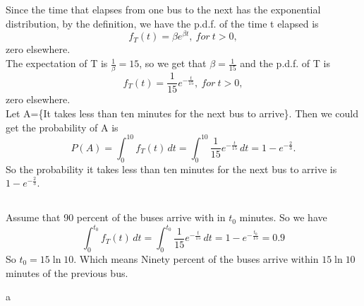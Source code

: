 \documentclass[10.5pt]{article}
\begin{document}
\section{}
\subsection{}
Since the time that elapses from one bus to the next has the exponential distribution, by the definition, we have the p.d.f. of the time t elapsed is $$f_T(t)=\beta e^{\beta t},~for ~t>0,$$\indent
zero elsewhere.\\\indent
The expectation of T is $\frac{1}{\beta}=15$, so we get that $\beta=\frac{1}{15}$ and the p.d.f. of T is $$f_T(t)=\frac{1}{15}e^{-\frac{t}{15}},~for ~t>0,$$\indent
zero elsewhere.\\\indent
Let A=\{It takes less than ten minutes for the next bus to arrive\}. Then we could get the probability of A is $$P(A)=\int_0^{10}f_T(t)\,dt=\int_0^{10}\frac{1}{15}e^{-\frac{t}{15}}\,dt=1-e^{-\frac{2}{3}}.$$\indent
So the probability it takes less than ten minutes for the next bus to arrive is $1-e^{-\frac{2}{3}}$.
\subsection{}
Assume that 90 percent of the buses arrive with in $t_0$ minutes. So we have $$\int_0^{t_0}f_T(t)\,dt=\int_0^{t_0}\frac{1}{15}e^{-\frac{t}{15}}\,dt=1-e^{-\frac{t_0}{15}}=0.9$$\indent
So $t_0=15\ln{10}$. Which means Ninety percent of the buses arrive within $15\ln{10}$ minutes of the previous bus.


\newpage
a
\end{document}
